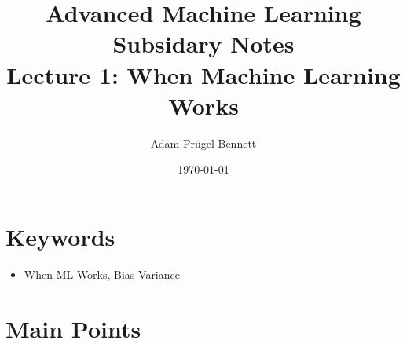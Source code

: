 \documentclass[11pt]{article}
\author{Adam Prügel-Bennett}
\date{\today}
\title{Advanced Machine Learning Subsidary Notes\\\medskip
\large Lecture 1: When Machine Learning Works}
\begin{document}
\maketitle


\section{Keywords}
\label{sec:orgb46b4dd}
\begin{itemize}
\item When ML Works, Bias Variance
\end{itemize}


\section{Main Points}
\label{sec:orge14fcb2}
\end{document}
